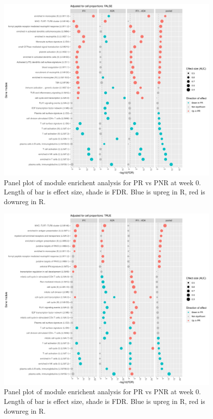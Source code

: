 \begin{outline}
\begin{figure}
    \centering
    \includegraphics[width=1.0\textwidth,page=1]{mainmatter/figures/chapter_04/plot_gene_set_enrichment.tmodCERNO_panelplot_reversed_C_1RI_1NI,C_1RA_1NA,C_(1RI_1NI)_(1RA_1NA),C_1R_1N.cell_prop_correction_FALSE.pdf}
    \caption{Panel plot of module enrichent analysis for PR vs PNR at week 0. Length of bar is effect size, shade is FDR. Blue is upreg in R, red is downreg in R.}
    \label{fig:multipants_dge_panelPlot_week_0_R_N_cellPropF}
\end{figure}

\begin{figure}
    \centering
    \includegraphics[width=1.0\textwidth,page=1]{mainmatter/figures/chapter_04/plot_gene_set_enrichment.tmodCERNO_panelplot_reversed_C_1RI_1NI,C_1RA_1NA,C_(1RI_1NI)_(1RA_1NA),C_1R_1N.cell_prop_correction_TRUE.pdf}
    \caption{Panel plot of module enrichent analysis for PR vs PNR at week 0. Length of bar is effect size, shade is FDR. Blue is upreg in R, red is downreg in R.}
    \label{fig:multipants_dge_panelPlot_week_0_R_N_cellPropT}
\end{figure}


\end{outline}
